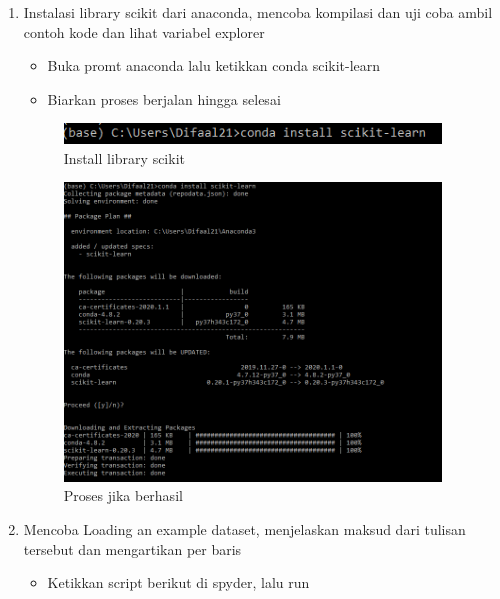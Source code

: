 	\begin{enumerate}
		\item Instalasi library scikit dari anaconda, mencoba kompilasi dan uji coba ambil contoh kode dan lihat variabel explorer

			\begin{itemize}
				\item Buka promt anaconda lalu ketikkan conda scikit-learn
				\item Biarkan proses berjalan hingga selesai
			\end{itemize}
		
			\begin{figure}[H]
				\begin{center}
				 \includegraphics[width=10cm]{figures/1174076/figures1/1.PNG}
				 \caption{Install library scikit}	
				\end{center}
			\end{figure}
			
			\begin{figure}[H]
				\begin{center}
				 \includegraphics[width=10cm]{figures/1174076/figures1/2.PNG}
				 \caption{Proses jika berhasil}	
				\end{center}
			\end{figure}
	
		\item Mencoba Loading an example dataset, menjelaskan maksud dari tulisan tersebut dan mengartikan per baris

			\begin{itemize}
				\item Ketikkan script berikut di spyder, lalu run
					
			\end{itemize}


\end{enumerate}
